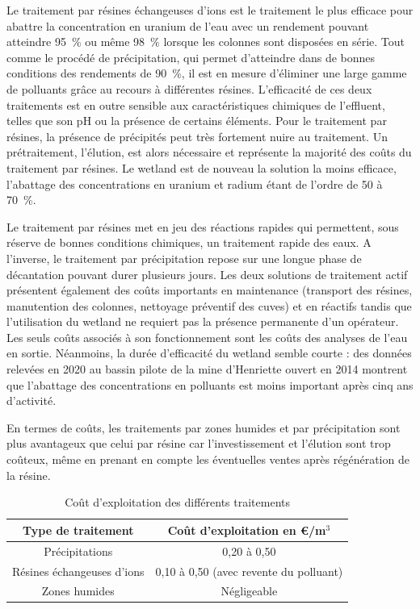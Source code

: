 \documentclass{article}
\begin{document}
Le traitement par résines échangeuses d’ions est le traitement le plus efficace pour abattre la concentration en uranium de l’eau avec un rendement pouvant atteindre 95~\% ou même 98~\% lorsque les colonnes sont disposées en série.  Tout comme le procédé de précipitation, qui permet d’atteindre dans de bonnes conditions des rendements de 90~\%, il est en mesure d’éliminer une large gamme de polluants grâce au recours à différentes résines. L’efficacité de ces deux traitements est en outre sensible aux caractéristiques chimiques de l’effluent, telles que son pH ou la présence de certains éléments. Pour le traitement par résines, la présence de précipités peut très fortement nuire au traitement. Un prétraitement, l’élution, est alors nécessaire et représente la majorité des coûts du traitement par résines. Le wetland est de nouveau la solution la moins efficace, l’abattage des concentrations en uranium et radium étant de l’ordre de 50 à 70~\%.

Le traitement par résines met en jeu des réactions rapides qui permettent, sous réserve de bonnes conditions chimiques, un traitement rapide des eaux. A l’inverse, le traitement par précipitation repose sur une longue phase de décantation pouvant durer plusieurs jours. Les deux solutions de traitement actif présentent également des coûts importants en maintenance (transport des résines, manutention des colonnes, nettoyage préventif des cuves) et en réactifs tandis que l’utilisation du wetland ne requiert pas la présence permanente d’un opérateur. Les seuls coûts associés à son fonctionnement sont les coûts des analyses de l’eau en sortie.  Néanmoins, la durée d’efficacité du wetland semble courte : des données relevées en 2020 au bassin pilote de la mine d’Henriette ouvert en 2014 montrent que l’abattage des concentrations en polluants est moins important après cinq ans d’activité. 

En termes de coûts, les traitements par zones humides et par précipitation sont plus avantageux que celui par résine car l’investissement et l’élution sont trop coûteux, même en prenant en compte les éventuelles ventes après régénération de la résine.


\begin{table}[H]
    \centering
   \caption{Coût d'exploitation des différents traitements \cite{schick_les_2020}}
    \begin{tabular}{ |c |c |}
        \hline
         \textbf{Type de traitement} & \textbf{Coût d’exploitation en \euro{}/m$^3$} \\ 
         \hline
         Précipitations & 0,20 à 0,50 \\ 
         \hline
         Résines échangeuses d’ions & 0,10 à 0,50 (avec revente du polluant)  \\
         \hline
        Zones humides & Négligeable  \\
         \hline
    \end{tabular}
\label{tab:cout_exploitation_traitements}
\end{table}
\end{document}
